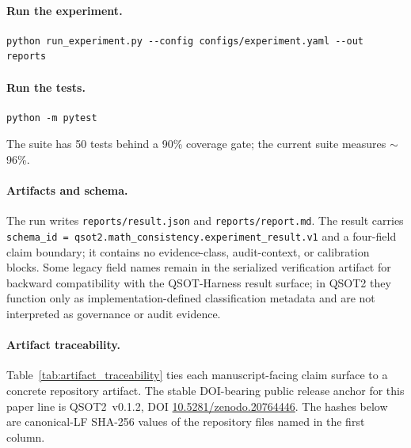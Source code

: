 \paragraph{Run the experiment.}
\begin{verbatim}
python run_experiment.py --config configs/experiment.yaml --out reports
\end{verbatim}

\paragraph{Run the tests.}
\begin{verbatim}
python -m pytest
\end{verbatim}
The suite has 50 tests behind a 90\% coverage gate; the current suite measures
$\sim$96\%.

\paragraph{Artifacts and schema.} The run writes \texttt{reports/result.json} and
\texttt{reports/report.md}. The result carries
\texttt{schema\_id = qsot2.math\_consistency.experiment\_result.v1} and a four-field
claim boundary; it contains no evidence-class, audit-context, or calibration blocks.
Some legacy field names remain in the serialized verification artifact for backward
compatibility with the QSOT-Harness result surface; in QSOT2 they function only as
implementation-defined classification metadata and are not interpreted as governance or
audit evidence.

\paragraph{Artifact traceability.} Table~\ref{tab:artifact_traceability} ties each
manuscript-facing claim surface to a concrete repository artifact. The stable DOI-bearing
public release anchor for this paper line is QSOT2~v0.1.2, DOI
\href{https://doi.org/10.5281/zenodo.20764446}{10.5281/zenodo.20764446}. The hashes below
are canonical-LF SHA-256 values of the repository files named in the first column.

